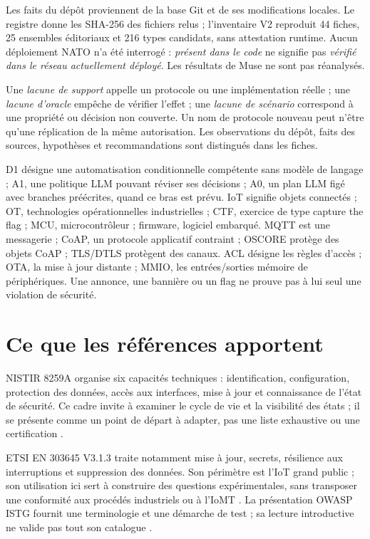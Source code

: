 \documentclass[11pt,a4paper]{article}
\newcommand{\code}[1]{{\small\ttfamily\path{#1}}}
\begin{document}
Les faits du dépôt proviennent de la base Git \code{73369b0} et de ses modifications locales. Le registre donne les SHA-256 des fichiers relus ; l'inventaire V2 reproduit 44 fiches, 25 ensembles éditoriaux et 216 types candidats, sans attestation runtime. Aucun déploiement NATO n'a été interrogé : \emph{présent dans le code} ne signifie pas \emph{vérifié dans le réseau actuellement déployé}. Les résultats de Muse ne sont pas réanalysés.

Une \emph{lacune de support} appelle un protocole ou une implémentation réelle ; une \emph{lacune d'oracle} empêche de vérifier l'effet ; une \emph{lacune de scénario} correspond à une propriété ou décision non couverte. Un nom de protocole nouveau peut n'être qu'une réplication de la même autorisation. Les observations du dépôt, faits des sources, hypothèses et recommandations sont distingués dans les fiches.

D1 désigne une automatisation conditionnelle compétente sans modèle de langage ; A1, une politique LLM pouvant réviser ses décisions ; A0, un plan LLM figé avec branches préécrites, quand ce bras est prévu. IoT signifie objets connectés ; OT, technologies opérationnelles industrielles ; CTF, exercice de type capture the flag ; MCU, microcontrôleur ; firmware, logiciel embarqué. MQTT est une messagerie ; CoAP, un protocole applicatif contraint ; OSCORE protège des objets CoAP ; TLS/DTLS protègent des canaux. ACL désigne les règles d'accès ; OTA, la mise à jour distante ; MMIO, les entrées/sorties mémoire de périphériques. Une annonce, une bannière ou un flag ne prouve pas à lui seul une violation de sécurité.

\section{Ce que les références apportent}
NISTIR 8259A organise six capacités techniques : identification, configuration, protection des données, accès aux interfaces, mise à jour et connaissance de l'état de sécurité. Ce cadre invite à examiner le cycle de vie et la visibilité des états ; il se présente comme un point de départ à adapter, pas une liste exhaustive ou une certification \cite{nist}.

ETSI EN 303645 V3.1.3 traite notamment mise à jour, secrets, résilience aux interruptions et suppression des données. Son périmètre est l'IoT grand public ; son utilisation ici sert à construire des questions expérimentales, sans transposer une conformité aux procédés industriels ou à l'IoMT \cite{etsi}. La présentation OWASP ISTG fournit une terminologie et une démarche de test ; sa lecture introductive ne valide pas tout son catalogue \cite{istg}.
\end{document}
